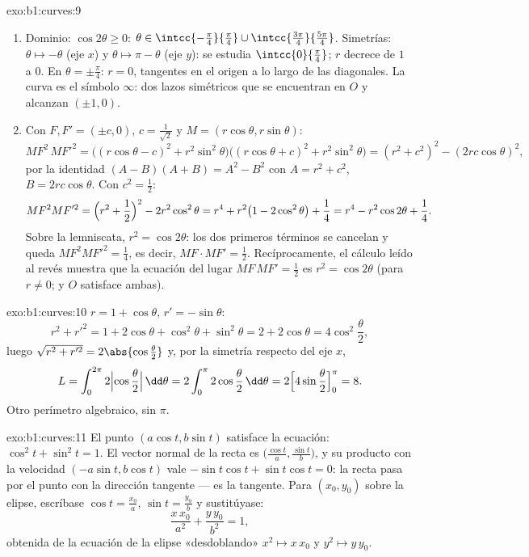 \begin{solution}{exo:b1:curves:9}
\begin{enumerate}
  \item Dominio: $\cos 2\theta \geq 0$: $\theta \in
        \intcc{-\frac\pi4}{\frac\pi4} \cup
        \intcc{\frac{3\pi}{4}}{\frac{5\pi}{4}}$. Simetrías: $\theta
        \mapsto -\theta$ (eje $x$) y $\theta \mapsto \pi -
        \theta$ (eje $y$): se estudia $\intcc{0}{\frac\pi4}$; $r$
        decrece de $1$ a $0$. En $\theta = \pm\frac\pi4$: $r =
        0$, tangentes en el origen a lo largo de las diagonales. La curva
        es el símbolo $\infty$: dos lazos simétricos que se encuentran
        en $O$ y alcanzan $(\pm 1, 0)$.
  \item Con $F, F' = (\pm c, 0)$, $c = \frac{1}{\sqrt 2}$ y $M
        = (r\cos\theta, r\sin\theta)$:
        \[
        MF^2\, MF'^2
        = \bigl((r\cos\theta - c)^2 + r^2\sin^2\theta\bigr)
        \bigl((r\cos\theta + c)^2 + r^2\sin^2\theta\bigr)
        = (r^2 + c^2)^2 - (2rc\cos\theta)^2 ,
        \]
        por la identidad $(A - B)(A + B) = A^2 - B^2$ con $A = r^2
        + c^2$, $B = 2rc\cos\theta$. Con $c^2 = \frac12$:
        \[
        MF^2 MF'^2 = \Bigl(r^2 + \frac12\Bigr)^2 - 2r^2\cos^2\theta
        = r^4 + r^2\bigl(1 - 2\cos^2\theta\bigr) + \frac14
        = r^4 - r^2\cos 2\theta + \frac14 .
        \]
        Sobre la lemniscata, $r^2 = \cos 2\theta$: los dos primeros
        términos se cancelan y queda $MF^2MF'^2 = \frac14$, es decir,
        $MF \cdot MF' = \frac12$. Recíprocamente, el cálculo leído al
        revés muestra que la ecuación del lugar $MF\,MF' = \frac12$ es
        $r^2 = \cos 2\theta$ (para $r \neq 0$; y $O$ satisface ambas).
\end{enumerate}
\end{solution}

\begin{solution}{exo:b1:curves:10}
$r = 1 + \cos\theta$, $r' = -\sin\theta$:
\[
r^2 + r'^2 = 1 + 2\cos\theta + \cos^2\theta + \sin^2\theta
= 2 + 2\cos\theta = 4\cos^2\frac\theta2 ,
\]
luego $\sqrt{r^2 + r'^2} = 2\abs{\cos\frac\theta2}$ y, por la
simetría respecto del eje $x$,
\[
L = \int_0^{2\pi} 2\Bigl|\cos\frac\theta2\Bigr|\,\dd\theta
= 2\int_0^{\pi} 2\cos\frac\theta2\,\dd\theta
= 2\Bigl[4\sin\frac\theta2\Bigr]_0^{\pi} = 8 .
\]
Otro perímetro algebraico, sin $\pi$.
\end{solution}

\begin{solution}{exo:b1:curves:11}
El punto $(a\cos t, b\sin t)$ satisface la ecuación:
$\cos^2 t + \sin^2 t = 1$. El vector normal de la recta es
$\bigl(\frac{\cos t}a, \frac{\sin t}b\bigr)$, y su producto
con la velocidad $(-a\sin t, b\cos t)$ vale $-\sin t\cos t +
\sin t\cos t = 0$: la recta pasa por el punto con la
dirección tangente --- es la tangente. Para $(x_0, y_0)$ sobre la
elipse, escríbase $\cos t = \frac{x_0}a$, $\sin t = \frac{y_0}b$ y
sustitúyase:
\[
\frac{x\,x_0}{a^2} + \frac{y\,y_0}{b^2} = 1 ,
\]
obtenida de la ecuación de la elipse «desdoblando» $x^2 \mapsto
x\,x_0$ y $y^2 \mapsto y\,y_0$.
\end{solution}

